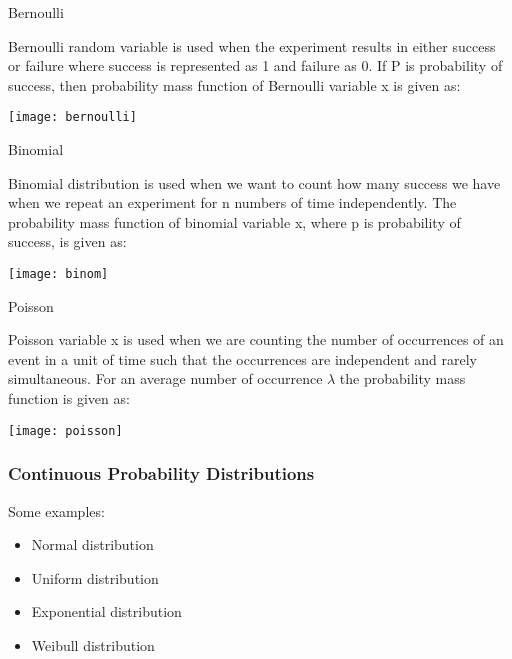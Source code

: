 \begin{frame}{Bernoulli}

Bernoulli random variable is used when the experiment results in
either success or failure where success is represented as 1 and failure as
0. If P is probability of success, then probability mass function of
Bernoulli variable x is given as:

\begin{center}
\texttt{[image: bernoulli]}
\end{center}
\end{frame}

\begin{frame}{Binomial}

Binomial distribution is used when we want to count how many success we
have when we repeat an experiment for n numbers of time
independently. The probability mass function of binomial variable x,
where p is probability of success, is given as:

\begin{center}
\texttt{[image: binom]}
\end{center}
\end{frame}

\begin{frame}{Poisson}

Poisson variable x is used when we are counting the number of
occurrences of an event in a unit of time such that the occurrences are
independent and rarely simultaneous. For an average number of
occurrence $\lambda$ the probability mass function is given as:
\begin{center}
\texttt{[image: poisson]}
\end{center}
\end{frame}


\begin{frame}
\frametitle{Continuous Probability Distributions }
Some examples:
\begin{itemize}
\item  Normal distribution 
 
\item  Uniform distribution 
 
\item  Exponential distribution 
 
\item  Weibull distribution 
 
\end{itemize}
\end{frame}

